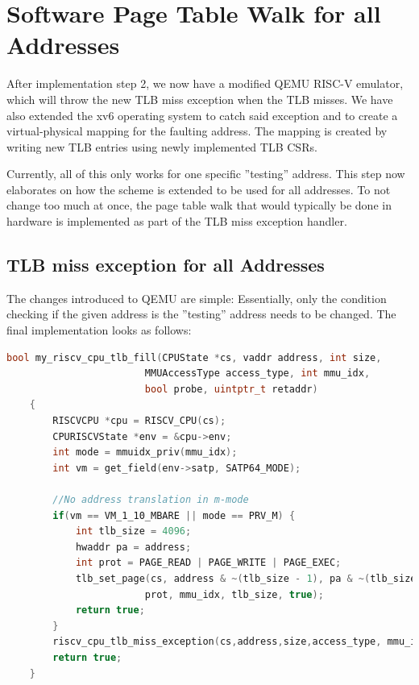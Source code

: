 \section{Software Page Table Walk for all Addresses}
After implementation step 2, we now have a modified QEMU RISC-V emulator, which will throw the new
TLB miss exception when the TLB misses.
We have also extended the xv6 operating system to catch said exception and to create a virtual-physical
mapping for the faulting address.
The mapping is created by writing new TLB entries using newly implemented TLB CSRs.

Currently, all of this only works for one specific ''testing'' address. This step now elaborates on
how the scheme is extended to be used for all addresses.
To not change too much at once, the page table walk that would typically be done in hardware is
implemented as part of the TLB miss exception handler.

\subsection{TLB miss exception for all Addresses}
The changes introduced to QEMU are simple: Essentially, only the condition checking if the given address is
the ''testing'' address needs to be changed.
The final implementation looks as follows:

\begin{lstlisting}[language=c,float=h!,basicstyle=\footnotesize,
    caption={\textbf{TLB Fill Function in QEMU}},
    label={lst:updatedTLBFill}]
    bool my_riscv_cpu_tlb_fill(CPUState *cs, vaddr address, int size,
                        MMUAccessType access_type, int mmu_idx,
                        bool probe, uintptr_t retaddr)
    {
        RISCVCPU *cpu = RISCV_CPU(cs);
        CPURISCVState *env = &cpu->env;
        int mode = mmuidx_priv(mmu_idx);
        int vm = get_field(env->satp, SATP64_MODE);

        //No address translation in m-mode
        if(vm == VM_1_10_MBARE || mode == PRV_M) {
            int tlb_size = 4096;
            hwaddr pa = address;
            int prot = PAGE_READ | PAGE_WRITE | PAGE_EXEC;
            tlb_set_page(cs, address & ~(tlb_size - 1), pa & ~(tlb_size - 1),
                        prot, mmu_idx, tlb_size, true);
            return true;
        }
        riscv_cpu_tlb_miss_exception(cs,address,size,access_type, mmu_idx, probe, retaddr);
        return true;
    }
\end{lstlisting}

